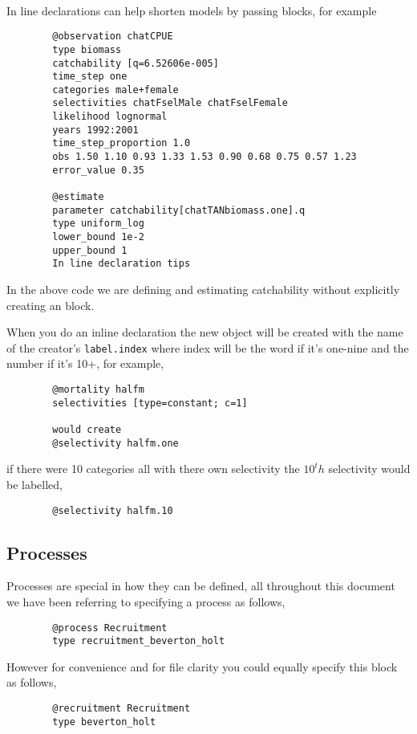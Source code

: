 \paragraph*{\label{sec:declare}}
In line declarations can help shorten models by passing \command{} blocks, for example 
{\small{\begin{verbatim}
		@observation chatCPUE
		type biomass
		catchability [q=6.52606e-005]
		time_step one
		categories male+female
		selectivities chatFselMale chatFselFemale
		likelihood lognormal
		years 1992:2001
		time_step_proportion 1.0
		obs 1.50 1.10 0.93 1.33 1.53 0.90 0.68 0.75 0.57 1.23
		error_value 0.35
		
		@estimate 
		parameter catchability[chatTANbiomass.one].q
		type uniform_log
		lower_bound 1e-2
		upper_bound 1
		In line declaration tips
		\end{verbatim}}}

In the above code we are defining and estimating catchability without explicitly creating an  block.

When you do an inline declaration the new object will be created with the name of the creator's \texttt{label.index} where index will be the word if it's one-nine and the number if it's 10+, for example,
{\small{\begin{verbatim}
		@mortality halfm
		selectivities [type=constant; c=1]
		
		would create
		@selectivity halfm.one
		\end{verbatim}}}

if there were 10 categories all with there own selectivity the $10^th$ selectivity would be labelled,

{\small{\begin{verbatim}
		@selectivity halfm.10
		\end{verbatim}}}


\subsection{Processes}
Processes are special in how they can be defined, all throughout this document we have been referring to specifying a process as follows,

{\small{\begin{verbatim}
		@process Recruitment
		type recruitment_beverton_holt
		\end{verbatim}}}
However for convenience and for file clarity you could equally specify this block as follows,
{\small{\begin{verbatim}
		@recruitment Recruitment
		type beverton_holt
		\end{verbatim}}}

